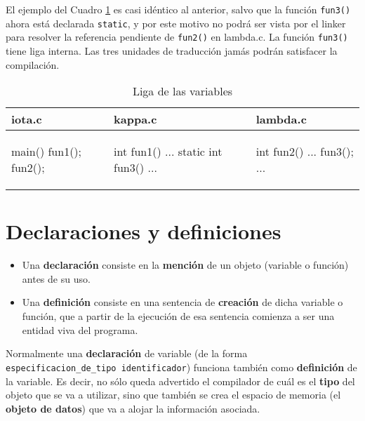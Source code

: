 \begin{ejemplo}
El ejemplo del Cuadro \ref{tab:ejliga2} es casi idéntico al anterior, salvo que la función \lstinline{fun3()} ahora está declarada \lstinline{static}, y por este motivo no podrá ser vista por el linker para resolver la referencia pendiente de \lstinline{fun2()} en
lambda.c. La función \lstinline{fun3()} tiene liga interna. Las tres unidades de traducción jamás podrán satisfacer la compilación.

\begin{table}
\centering	
\begin{tabular}{l|l|l}
iota.c & kappa.c & lambda.c \\
\hline
\begin{codecell}
main()
{
	fun1();
	fun2();
}
\end{codecell}
&
\begin{codecell}
int fun1()
{
	...
}
static int fun3()
{
	...
}
\end{codecell}
&
\begin{codecell}
int fun2()
{
	...
	fun3();
	...
}
\end{codecell}
\\
\end{tabular}
 \caption{Liga de las variables}
 \label{tab:ejliga2} 
\end{table}
\end{ejemplo}


\section{Declaraciones y definiciones}
\begin{itemize}
	\item Una \textbf{declaración} consiste en la \textbf{mención} de un objeto (variable o función) antes de su uso.
	\item Una \textbf{definición} consiste en una sentencia de \textbf{creación} de dicha variable o función, que a partir de la ejecución de esa sentencia comienza a ser una entidad viva del programa.
\end{itemize}


Normalmente una \textbf{declaración} de variable (de la forma \lstinline{especificacion_de_tipo identificador}) funciona
también como \textbf{definición} de la variable. Es decir, no sólo queda advertido el compilador de cuál es el
\textbf{tipo} del objeto que se va a utilizar, sino que también se crea el espacio de memoria (el \textbf{objeto de datos})
que va a alojar la información asociada.

